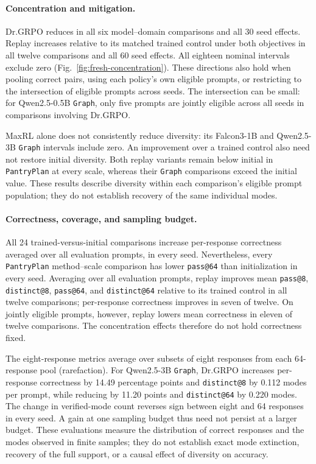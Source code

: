 \paragraph{Concentration and mitigation.}
Dr.GRPO reduces \pmd{} in all six model--domain comparisons and all
30 seed effects. Replay increases \pmd{} relative to its matched trained
control under both objectives in all twelve comparisons and all 60 seed
effects. All eighteen nominal intervals exclude zero
(Fig.~\ref{fig:fresh-concentration}). These directions also hold when
pooling correct pairs, using each policy's own eligible prompts, or
restricting to the intersection of eligible prompts across seeds.
The intersection can be small: for Qwen2.5-0.5B \texttt{Graph}, only five
prompts are jointly eligible across all seeds in comparisons involving Dr.GRPO.

MaxRL alone does not consistently reduce diversity: its Falcon3-1B and
Qwen2.5-3B \texttt{Graph} intervals include zero. An improvement over a
trained control also need not restore initial diversity. Both replay
variants remain below initial \pmd{} in \texttt{PantryPlan} at every
scale, whereas their \texttt{Graph} comparisons exceed the initial value.
These results describe diversity within each comparison's eligible prompt
population; they do not establish recovery of the same individual modes.

\paragraph{Correctness, coverage, and sampling budget.}
All 24 trained-versus-initial comparisons increase per-response
correctness averaged over all evaluation prompts, in every seed. Nevertheless, every
\texttt{PantryPlan} method--scale comparison has lower \texttt{pass@64}
than initialization in every seed. Averaging over all evaluation prompts,
replay improves mean
\texttt{pass@8}, \texttt{distinct@8}, \texttt{pass@64}, and
\texttt{distinct@64} relative to its trained control in all twelve
comparisons; per-response correctness improves in seven of twelve.
On jointly eligible prompts, however, replay lowers mean correctness in
eleven of twelve comparisons. The concentration effects therefore do not
hold correctness fixed.

The eight-response metrics average over subsets of eight responses from
each 64-response pool (rarefaction). For Qwen2.5-3B \texttt{Graph}, Dr.GRPO increases per-response correctness by
14.49 percentage points and \texttt{distinct@8} by 0.112 modes per prompt,
while reducing \pmd{} by 11.20 points and \texttt{distinct@64} by
0.220 modes. The change in verified-mode count reverses sign between
eight and 64 responses in every seed. A gain at one sampling budget thus
need not persist at a larger budget. These evaluations measure the
distribution of correct responses and the modes observed in finite samples;
they do not establish exact mode extinction, recovery of the full support,
or a causal effect of diversity on accuracy.



\FloatBarrier
